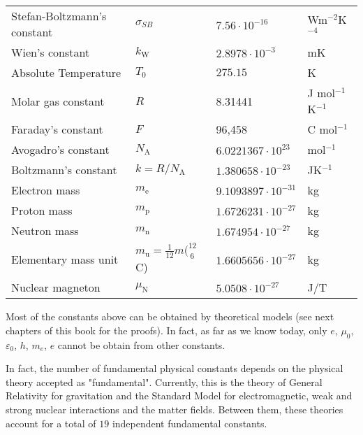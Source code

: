\begin{center}
\begin{tabular}{||l|lll||}
	Stefan-Boltzmann's constant  &$\sigma_{SB}$&$7.56\cdot 10^{-16}$&Wm$^{-2}$K$^{-4}$\rule{0pt}{13pt}\\
	Wien's constant              &$k_{\text{W}}$&$2.8978\cdot 10^{-3}$&mK\\
	Absolute Temperature         &$T_0$&$275.15$&K\\
	\hline
	Molar gas constant            &$R$&8.31441&J mol$^{-1}$K$^{-1}$\\
	Faraday's constant           &$F$&96,458&C mol$^{-1}$\\
	Avogadro's constant          &$N_{\text{A}}$&$6.0221367\cdot  10^{23}$&mol$^{-1}$\\
	Boltzmann's constant         &$k=R/N_{\text{A}}$&$1.380658\cdot10^{-23}$&JK$^{-1}$\\
	\hline
	Electron mass                &$m_{\text{e}}$&$9.1093897\cdot10^{-31}$&kg\rule{0pt}{13pt}\\
	Proton mass                  &$m_{\text{p}}$&$1.6726231\cdot10^{-27}$&kg\\
	Neutron mass                 &$m_{\text{n}}$&$1.674954\cdot10^{-27}$&kg\\
	Elementary mass unit         &$m_{\text{u}}=\frac{1}{12}m(^{12}_{~6}$C)&$1.6605656\cdot10^{-27}$&kg\\
	Nuclear magneton             &$\mu_{\text{N}}$&$5.0508\cdot10^{-27}$&J/T\\
	\hline
	\end{tabular}
	\end{center}
	Most of the constants above can be obtained by theoretical models (see next chapters of this book for the proofs). In fact, as far as we know today, only $e$, $\mu_0$, $\varepsilon_0$, $h$, $m_e$, $e$ cannot be obtain from other constants.
	
	In fact, the number of fundamental physical constants depends on the physical theory accepted as "fundamental". Currently, this is the theory of General Relativity for gravitation and the Standard Model for electromagnetic, weak and strong nuclear interactions and the matter fields. Between them, these theories account for a total of $19$ independent fundamental constants.
	
	\pagebreak
